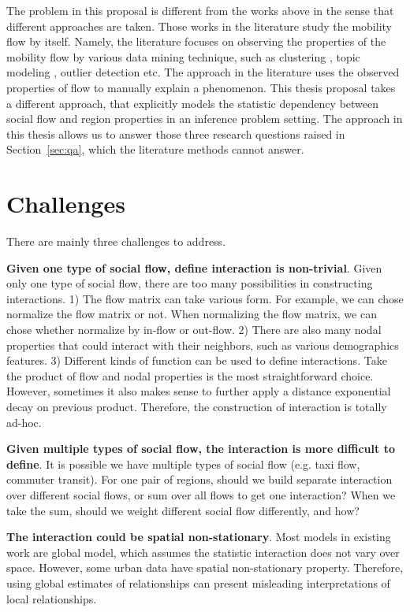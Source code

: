 The problem in this proposal is different from the works above in the sense that different approaches are taken. Those works in the literature study the mobility flow by itself. Namely, the literature focuses on observing the properties of the mobility flow by various data mining technique, such as clustering \cite{berlingerio2013allaboard}, topic modeling \cite{yuan2012discovering}, outlier detection \cite{zheng2011urban} etc.  The approach in the literature uses the observed properties of flow to manually explain a phenomenon. This thesis proposal takes a different approach, that explicitly models the statistic dependency between social flow and region properties in an inference problem setting. The approach in this thesis allows us to answer those three research questions raised in Section~\ref{sec:qa}, which the literature methods cannot answer.



\section{Challenges}

There are mainly three challenges to address.

\textbf{Given one type of social flow, define interaction is non-trivial}. Given only one type of social flow, there are too many possibilities in constructing interactions.   1) The flow matrix can take various form. For example, we can chose normalize the flow matrix or not. When normalizing the flow matrix, we can chose whether normalize by in-flow or out-flow. 
2) There are also many nodal properties that could interact with their neighbors, such as various demographics features. 
3) Different kinds of function can be used to define interactions. Take the product of flow and nodal properties is the most straightforward choice. However, sometimes it also makes sense to further apply a distance exponential decay on previous product.
Therefore, the construction of interaction is totally ad-hoc. 


\textbf{Given multiple types of social flow, the interaction is more difficult to define}. It is possible we have multiple types of social flow (e.g. taxi flow, commuter transit). For one pair of regions, should we build separate interaction over different social flows, or sum over all flows to get one interaction? When we take the sum, should we weight different social flow differently, and how?


\textbf{The interaction could be spatial non-stationary}. Most models in existing work are global model, which assumes the statistic interaction does not vary over space. However, some urban data have spatial non-stationary property. Therefore, using global estimates of relationships can present misleading interpretations of local relationships.





